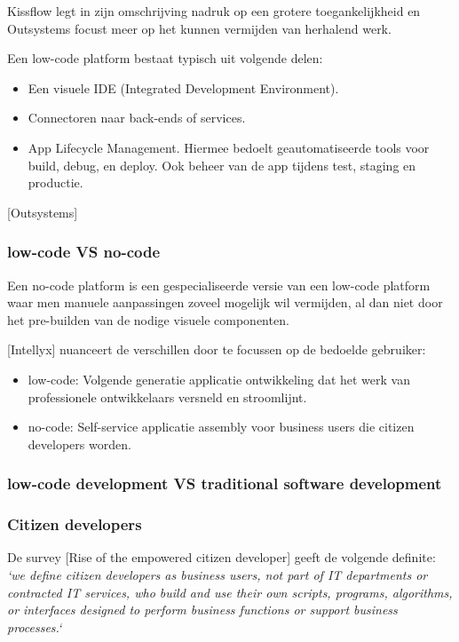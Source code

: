 Kissflow legt in zijn omschrijving nadruk op een grotere toegankelijkheid en Outsystems focust meer op het kunnen vermijden van herhalend werk.

Een low-code platform bestaat typisch uit volgende delen:
\begin{itemize}
    \item Een visuele IDE (Integrated Development Environment).
    \item Connectoren naar back-ends of services.
    \item App Lifecycle Management. Hiermee bedoelt geautomatiseerde tools voor build, debug, en deploy. Ook beheer van de app tijdens test, staging en productie.
\end{itemize} [Outsystems]

\subsubsection{low-code VS no-code}

Een no-code platform is een gespecialiseerde versie van een low-code platform waar men manuele aanpassingen zoveel mogelijk wil vermijden, al dan niet door het pre-builden van de nodige visuele componenten.

[Intellyx] nuanceert de verschillen door te focussen op de bedoelde gebruiker:
\begin{itemize}
    \item low-code: Volgende generatie applicatie ontwikkeling dat het werk van professionele ontwikkelaars versneld en stroomlijnt.
    \item no-code: Self-service applicatie assembly voor business users die citizen developers worden.
\end{itemize}

\subsubsection{low-code development VS traditional software development}

\subsubsection{Citizen developers}

De survey [Rise of the empowered citizen developer] geeft de volgende definite:\\
\textit{`we define citizen developers as business users, not part of IT departments or contracted IT services, who build and use their own scripts, programs, algorithms, or interfaces designed to perform business functions or support business processes.`}

